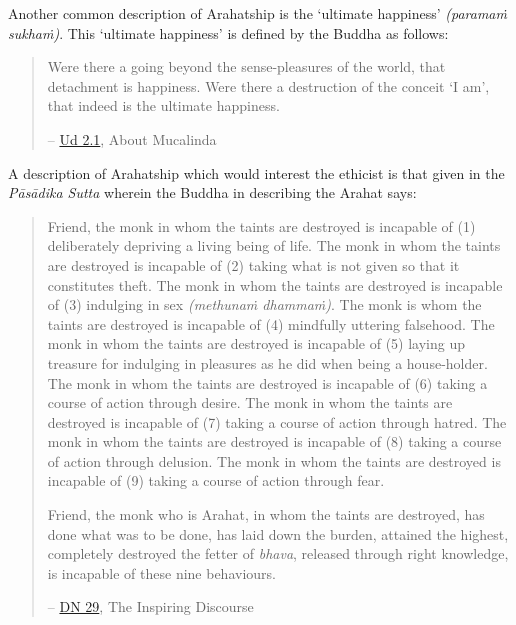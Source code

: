 
Another common description of Arahatship is the `ultimate happiness' \emph{(paramaṁ sukhaṁ)}. This `ultimate happiness' is defined by the Buddha as follows:

\begin{quote}
Were there a going beyond the sense-pleasures of the world, that detachment is happiness. Were there a destruction of the conceit `I am', that indeed is the ultimate happiness.

-- \href{https://suttacentral.net/ud2.1/en/anandajoti}{Ud 2.1}, About Mucalinda
\end{quote}

A description of Arahatship which would interest the ethicist is that given in the \emph{Pāsādika Sutta} wherein the Buddha in describing the Arahat says:

\begin{quote}
Friend, the monk in whom the taints are destroyed is incapable of (1) deliberately depriving a living being of life. The monk in whom the taints are destroyed is incapable of (2) taking what is not given so that it constitutes theft. The monk in whom the taints are destroyed is incapable of (3) indulging in sex \emph{(methunaṁ dhammaṁ)}. The monk is whom the taints are destroyed is incapable of (4) mindfully uttering falsehood. The monk in whom the taints are destroyed is incapable of (5) laying up treasure for indulging in pleasures as he did when being a house-holder. The monk in whom the taints are destroyed is incapable of (6) taking a course of action through desire. The monk in whom the taints are destroyed is incapable of (7) taking a course of action through hatred. The monk in whom the taints are destroyed is incapable of (8) taking a course of action through delusion. The monk in whom the taints are destroyed is incapable of (9) taking a course of action through fear.

Friend, the monk who is Arahat, in whom the taints are destroyed, has done what was to be done, has laid down the burden, attained the highest, completely destroyed the fetter of \emph{bhava}, released through right knowledge, is incapable of these nine behaviours.

-- \href{https://suttacentral.net/dn29/en/thanissaro}{DN 29}, The Inspiring Discourse
\end{quote}

